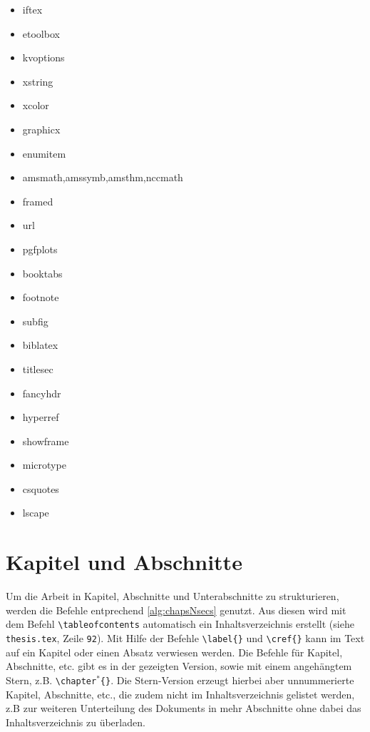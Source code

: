 \begin{minipage}{.49\textwidth}
\begin{itemize}
\item iftex
\item etoolbox
\item kvoptions
\item xstring
\item xcolor
\item graphicx
\item enumitem
\item amsmath,amssymb,amsthm,nccmath
\item framed
\item url
\item pgfplots
\end{itemize}
\end{minipage}\hfill
\begin{minipage}{.49\textwidth}
\begin{itemize}
\item booktabs
\item footnote
\item subfig
\item biblatex
\item titlesec
\item fancyhdr
\item hyperref
\item showframe
\item microtype
\item csquotes
\item lscape
\end{itemize}
\end{minipage}

\section{Kapitel und Abschnitte}
\label{sec:kapitel}

Um die Arbeit in Kapitel, Abschnitte und Unterabschnitte zu strukturieren, werden die Befehle entprechend \cref{alg:chapsNsecs} genutzt.
Aus diesen wird mit dem Befehl \texttt{\textbackslash{}tableofcontents} automatisch ein Inhaltsverzeichnis erstellt (siehe \texttt{thesis.tex}, Zeile \texttt{92}).
Mit Hilfe der Befehle \texttt{\textbackslash{}label\{\}} und \texttt{\textbackslash{}cref\{\}} kann im Text auf ein Kapitel oder einen Absatz verwiesen werden.
Die Befehle für Kapitel, Abschnitte, etc. gibt es in der gezeigten Version, sowie mit einem angehängtem Stern, z.B. \texttt{\textbackslash{}chapter$^\ast$\{\}}. 
Die Stern-Version erzeugt hierbei aber unnummerierte Kapitel, Abschnitte, etc., die zudem nicht im Inhaltsverzeichnis gelistet werden, z.B zur weiteren Unterteilung des Dokuments in mehr Abschnitte ohne dabei das Inhaltsverzeichnis zu überladen.

